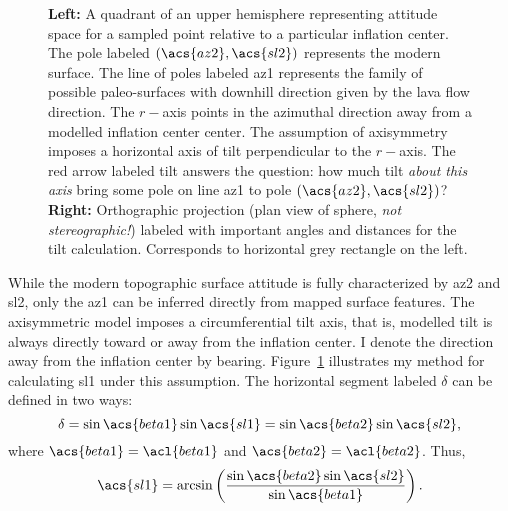 \begin{figure}
\begin{center}
    \hspace{1cm}%
    \caption[\Acl{tilt} from mapping]{\textbf{Left:} A quadrant of an upper hemisphere representing attitude space for a sampled point relative to a particular inflation center. The pole labeled $\left(\acs{az2},\acs{sl2}\right)$ represents the modern surface. The line of poles labeled \acs{az1} represents the family of possible paleo-surfaces with downhill direction given by the lava flow direction. The $r-$axis points in the azimuthal direction away from a modelled inflation center \acs{center}. The assumption of axisymmetry imposes a horizontal axis of tilt perpendicular to the $r-$axis. The red arrow labeled \acs{tilt} answers the question: how much tilt \emph{about this axis} bring some pole on line \acs{az1} to pole $\left(\acs{az2},\acs{sl2}\right)$? \textbf{Right:} Orthographic projection (plan view of sphere, \emph{not stereographic!}) labeled with important angles and distances for the tilt calculation. Corresponds to horizontal grey rectangle on the left.}%
    \label{fig:tilt-from-map}%
\end{center}
\end{figure}
While the modern topographic surface attitude is fully characterized by \acs{az2} and \acs{sl2}, only the \acf{az1} can be inferred directly from mapped surface features. The axisymmetric model imposes a circumferential tilt axis, that is, modelled tilt is always directly toward or away from the inflation center. I denote the direction away from the inflation center by \acs{bearing}. Figure~\ref{fig:tilt-from-map} illustrates my method for calculating \acf{sl1} under this assumption. The horizontal segment labeled $\delta$ can be defined in two ways:
\begin{equation*}
    \delta = \sin\acs{beta1}\sin\acs{sl1} = \sin\acs{beta2}\sin\acs{sl2},
\end{equation*}
where $\acs{beta1} = \acl{beta1}$ and $\acs{beta2} = \acl{beta2}$. Thus,
\begin{equation}
    \acs{sl1} = \arcsin\left(\frac{\sin\acs{beta2}\sin\acs{sl2}}{\sin\acs{beta1}}\right).\label{eq:sl1}
\end{equation}
